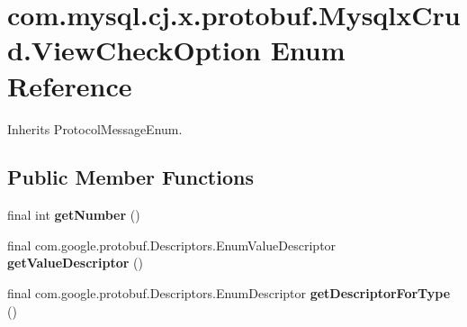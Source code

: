 \hypertarget{enumcom_1_1mysql_1_1cj_1_1x_1_1protobuf_1_1_mysqlx_crud_1_1_view_check_option}{}\section{com.\+mysql.\+cj.\+x.\+protobuf.\+Mysqlx\+Crud.\+View\+Check\+Option Enum Reference}
\label{enumcom_1_1mysql_1_1cj_1_1x_1_1protobuf_1_1_mysqlx_crud_1_1_view_check_option}


Inherits Protocol\+Message\+Enum.

\subsection*{Public Member Functions}
\begin{DoxyCompactItemize}
\item 
\mbox{\label{enumcom_1_1mysql_1_1cj_1_1x_1_1protobuf_1_1_mysqlx_crud_1_1_view_check_option_af132817e26fa30ec0130784233d01805}} 
final int {\bfseries get\+Number} ()
\item 
\mbox{\label{enumcom_1_1mysql_1_1cj_1_1x_1_1protobuf_1_1_mysqlx_crud_1_1_view_check_option_a3b84aaf0adf5912cec5a7df3560b36d9}} 
final com.\+google.\+protobuf.\+Descriptors.\+Enum\+Value\+Descriptor {\bfseries get\+Value\+Descriptor} ()
\item 
\mbox{\label{enumcom_1_1mysql_1_1cj_1_1x_1_1protobuf_1_1_mysqlx_crud_1_1_view_check_option_af1ca234a086692b38e2dd64eff823439}} 
final com.\+google.\+protobuf.\+Descriptors.\+Enum\+Descriptor {\bfseries get\+Descriptor\+For\+Type} ()
\end{DoxyCompactItemize}
